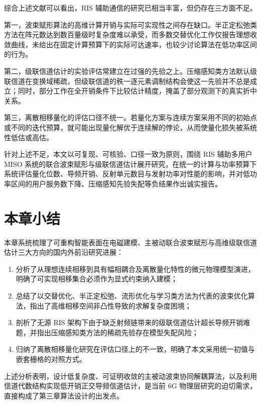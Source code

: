 综合上述文献可以看出，RIS 辅助通信的研究已相当丰富，但仍存在三方面不足。

第一，波束赋形算法的高维计算开销与实际可实现性之间存在缺口。半正定松弛类方法在阵元数达到数百量级时复杂度难以承受，而多数交替优化工作仅报告理想收敛曲线，未给出在固定计算预算下的实际可达速率，也较少讨论算法在低功率区间的行为。

第二，级联信道估计的实验评估常建立在过强的先验之上。压缩感知类方法默认级联信道在变换域稀疏，但级联信道的秩一逐元素调制结构会使这一先验并不总是成立；同时，部分工作在全开销条件下比较估计精度，掩盖了部分观测下的真实折中关系。

第三，离散相移量化的评估口径不统一。若量化方案与连续方案采用不同的初始点或不同的迭代预算，就可能出现量化解优于连续解的悖论，从而使量化损失被系统性低估或高估。

针对上述不足，本文以可复现、可核验、口径一致为原则，围绕 RIS 辅助多用户 MISO 系统的联合波束赋形与级联信道估计展开研究，在统一的计算与功率预算下系统评估量化位数、导频开销、反射单元数目与发射功率对性能的影响，并对低功率区间的用户服务数下降、压缩感知先验失配等负结果作出诚实报告。

\section{本章小结}

本章系统梳理了可重构智能表面在电磁建模、主被动联合波束赋形与高维级联信道估计三大方向的国内外前沿研究进展：

\begin{enumerate}
  \item 分析了从理想连续相移到具有幅相耦合及离散量化特性的微元物理模型演进，明确了可实现相移集合必须作为显式约束纳入建模；
  \item 总结了以交替优化、半正定松弛、流形优化与学习类方法为代表的波束优化算法，指出了高维相移空间非凸性导致的求解复杂度困境；
  \item 剖析了无源 RIS 架构下由于缺乏射频链带来的级联信道估计超长导频开销难题，并指出压缩感知类方法的稀疏先验存在模型失配风险；
  \item 归纳了离散相移量化研究在评估口径上的不一致，明确了本文采用统一初值与嵌套栅格的对照方式。
\end{enumerate}

上述分析表明，设计低复杂度、可证明收敛的主被动波束协同解耦算法，以及利用信道代数结构实现低开销正交导频信道估计，是当前 6G 物理层研究的迫切需求，直接构成了第三章算法设计的出发点。
